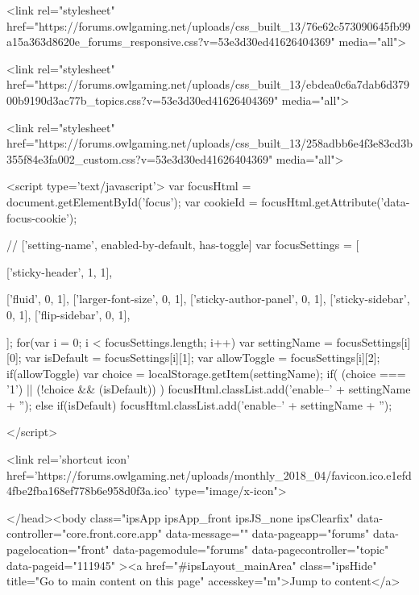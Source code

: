	<link rel="stylesheet" href="https://forums.owlgaming.net/uploads/css_built_13/76e62c573090645fb99a15a363d8620e_forums_responsive.css?v=53e3d30ed41626404369" media="all">

	<link rel="stylesheet" href="https://forums.owlgaming.net/uploads/css_built_13/ebdea0c6a7dab6d37900b9190d3ac77b_topics.css?v=53e3d30ed41626404369" media="all">





<link rel="stylesheet" href="https://forums.owlgaming.net/uploads/css_built_13/258adbb6e4f3e83cd3b355f84e3fa002_custom.css?v=53e3d30ed41626404369" media="all">




		
<script type='text/javascript'>
var focusHtml = document.getElementById('focus');
var cookieId = focusHtml.getAttribute('data-focus-cookie');

//	['setting-name', enabled-by-default, has-toggle]
var focusSettings = [
	
 ['sticky-header', 1, 1],
	
	['fluid', 0, 1],
	['larger-font-size', 0, 1],
	['sticky-author-panel', 0, 1],
	['sticky-sidebar', 0, 1],
	['flip-sidebar', 0, 1],
	
	
]; 
for(var i = 0; i < focusSettings.length; i++) {
	var settingName = focusSettings[i][0];
	var isDefault = focusSettings[i][1];
	var allowToggle = focusSettings[i][2];
	if(allowToggle){
		var choice = localStorage.getItem(settingName);
		if( (choice === '1') || (!choice && (isDefault)) ){
			focusHtml.classList.add('enable--' + settingName + '');
		}
	} else if(isDefault){
		focusHtml.classList.add('enable--' + settingName + '');
	}
}


</script>

 
		
		
		

	
	<link rel='shortcut icon' href='https://forums.owlgaming.net/uploads/monthly_2018_04/favicon.ico.e1efd4fbe2fba168ef778b6e958d0f3a.ico' type="image/x-icon">

		
 
	</head><body class="ipsApp ipsApp_front ipsJS_none ipsClearfix" data-controller="core.front.core.app"  data-message=""  data-pageapp="forums" data-pagelocation="front" data-pagemodule="forums" data-pagecontroller="topic" data-pageid="111945"  ><a href="#ipsLayout_mainArea" class="ipsHide" title="Go to main content on this page" accesskey="m">Jump to content</a>
		
